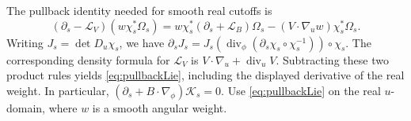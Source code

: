 \documentclass[11pt]{article}
\numberwithin{equation}{section}
\theoremstyle{definition}
\newcommand{\Li}{\mathcal L}
\begin{document}
The pullback identity needed for smooth real cutoffs is
\begin{equation}
 (\partial_s-\Li_V)(w\chi_s^*\Omega_s)
  =w\chi_s^*(\partial_s+\Li_B)\Omega_s
       -(V\cdot\nabla_u w)\chi_s^*\Omega_s.
 \label{eq:pullbackLie}
\end{equation}
Writing \(J_s=\det D_u\chi_s\), we have
\(\partial_sJ_s=J_s(\operatorname{div}_\phi
(\partial_s\chi_s\circ\chi_s^{-1}))\circ\chi_s\).
The corresponding density formula for \(\mathcal L_V\) is
\(V\cdot\nabla_u+\operatorname{div}_uV\).
Subtracting these two product rules yields \eqref{eq:pullbackLie},
including the displayed derivative of the real weight. In particular,
\((\partial_s+B\cdot\nabla_\phi)\mathcal K_s=0\).
Use \eqref{eq:pullbackLie} on the real \(u\)-domain, where \(w\)
is a smooth angular weight.
\end{document}
